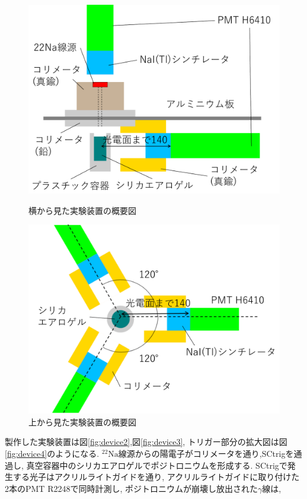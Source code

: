 \begin{figure}[H]
\begin{minipage}{0.5\hsize}
\centering
\includegraphics[keepaspectratio,scale=0.3]{fig/ybm/device5.pdf}
\caption{横から見た実験装置の概要図}
\label{fig:device5}
\end{minipage}
\begin{minipage}{0.5\hsize}
\centering
\includegraphics[keepaspectratio,scale=0.3]{fig/ybm/device6.pdf}
\caption{上から見た実験装置の概要図}
\label{fig:device6}
\end{minipage}
\end{figure}

製作した実験装置は図\ref{fig:device2},図\ref{fig:device3},
トリガー部分の拡大図は図\ref{fig:device4}のようになる.
$\mathrm{^{22}Na}$線源からの陽電子がコリメータを通り,SCtrigを通過し,
真空容器中のシリカエアロゲルでポジトロニウムを形成する.
SCtrigで発生する光子はアクリルライトガイドを通り,
アクリルライトガイドに取り付けた2本のPMT R2248で同時計測し,
ポジトロニウムが崩壊し放出された$\gamma$線は,

